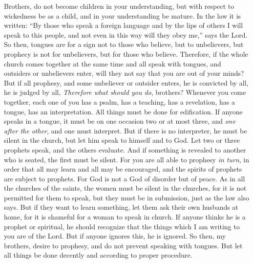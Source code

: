 \begin{biblechapter}
\verse Brothers, do not become children in your understanding, but with respect to wickedness be as a child, and in your understanding be mature.
\verse In the law it is written: “By those who speak a foreign language 
and by the lips of others 
I will speak to this people, 
and not even in this way will they obey me,”
\verse says the Lord.
\verse So then, tongues are for a sign not to those who believe, but to unbelievers, but prophecy is not for unbelievers, but for those who believe.
\verse Therefore, if the whole church comes together at the same time and all speak with tongues, and outsiders or unbelievers enter, will they not say that you are out of your minds?
\verse But if all prophesy, and some unbeliever or outsider enters, he is convicted by all, he is judged by all,
 \textit{Therefore what should you do}, brothers? Whenever you come together, each one of you has a psalm, has a teaching, has a revelation, has a tongue, has an interpretation. All things must be done for edification.
\verse If anyone speaks in a tongue, it must be on one occasion two or at most three, and \textit{one after the other}, and one must interpret.
\verse But if there is no interpreter, he must be silent in the church, but let him speak to himself and to God.
\verse Let two or three prophets speak, and the others evaluate.
\verse And if something is revealed to another who is seated, the first must be silent.
\verse For you are all able to prophesy \textit{in turn}, in order that all may learn and all may be encouraged,
\verse and the spirits of prophets are subject to prophets.
\verse For God is not a God of disorder but of peace.
\verse As in all the churches of the saints,
\verse the women must be silent in the churches, for it is not permitted for them to speak, but they must be in submission, just as the law also says.
\verse But if they want to learn something, let them ask their own husbands at home, for it is shameful for a woman to speak in church.
\verse If anyone thinks he is a prophet or spiritual, he should recognize that the things which I am writing to you are of the Lord.
\verse But if anyone ignores this, he is ignored.
\verse So then, my brothers, desire to prophesy, and do not prevent speaking with tongues.
\verse But let all things be done decently and according to proper procedure.
\end{biblechapter}

